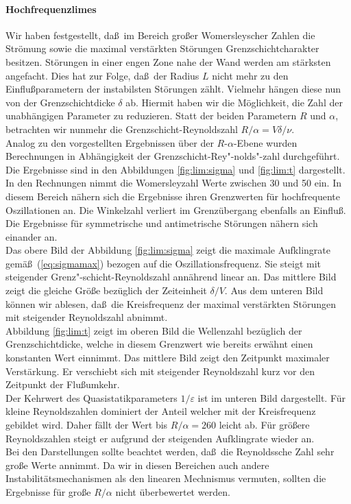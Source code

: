 \documentclass[10pt,a5paper,oneside,draft]{book}
\numberwithin{equation}{chapter}
\begin{document}
\paragraph{Hochfrequenzlimes}
Wir haben festgestellt, da\ss\ im Bereich gro\ss er Womersleyscher Zahlen die Str\"omung sowie die maximal verst\"arkten St\"orungen Grenzschichtcharakter besitzen.
St\"orungen in einer engen Zone nahe der Wand werden am st\"arksten angefacht.
Dies hat zur Folge, da\ss\ der Radius $L$ nicht mehr zu den Einflu\ss parametern der instabilsten St\"orungen z\"ahlt.
Vielmehr h\"angen diese nun von der Grenzschichtdicke $\delta$ ab.
Hiermit haben wir die M\"oglichkeit, die Zahl der unabh\"angigen Parameter zu reduzieren.
Statt der beiden Parametern $R$ und $\alpha$, betrachten wir nunmehr die Grenzschicht-Reynoldszahl $R/\alpha=V\delta/\nu$.\\
Analog zu den vorgestellten Ergebnissen \"uber der $R$-$\alpha$-Ebene wurden Berechnungen in Abh\"angigkeit der Grenzschicht-Rey"-nolds"-zahl durchgef\"uhrt.
Die Ergebnisse sind in den Abbildungen \ref{fig:lim:sigma} und \ref{fig:lim:t} dargestellt.\\
In den Rechnungen nimmt die Womersleyzahl Werte zwischen 30 und 50 ein.
In diesem Bereich n\"ahern sich die Ergebnisse ihren Grenzwerten f\"ur hochfrequente Oszillationen an.
Die Winkelzahl verliert im Grenz\"ubergang ebenfalls an Einflu\ss.
Die Ergebnisse f\"ur symmetrische und antimetrische St\"orungen n\"ahern sich einander an.\\
Das obere Bild der Abbildung \ref{fig:lim:sigma} zeigt die maximale Aufklingrate gem\"a\ss\  (\mbox{\ref{eq:sigmamax}}) bezogen auf die Oszillationsfrequenz.
Sie steigt mit steigender Grenz"-schicht-Reynoldszahl ann\"ahrend linear an.
Das mittlere Bild zeigt die gleiche Gr\"o\ss e bez\"uglich der Zeiteinheit $\delta/V$.
Aus dem unteren Bild k\"onnen wir ablesen, da\ss\ die Kreisfrequenz der maximal verst\"arkten St\"orungen mit steigender Reynoldszahl abnimmt.\\
Abbildung \ref{fig:lim:t} zeigt im oberen Bild die Wellenzahl bez\"uglich der Grenzschichtdicke, welche in diesem Grenzwert wie bereits erw\"ahnt einen konstanten Wert einnimmt.
Das mittlere Bild zeigt den Zeitpunkt maximaler Verst\"arkung.
Er verschiebt sich mit steigender Reynoldszahl kurz vor den Zeitpunkt der Flu\ss umkehr.\\
Der Kehrwert des Quasistatikparameters $1/\varepsilon$ ist im unteren Bild dargestellt.
F\"ur kleine Reynoldszahlen dominiert der Anteil welcher mit der Kreisfrequenz gebildet wird.
Daher f\"allt der Wert bis $R/\alpha=260$ leicht ab.
F\"ur gr\"o\ss ere Reynoldszahlen steigt er aufgrund der steigenden Aufklingrate wieder an.\\
Bei den Darstellungen sollte beachtet werden, da\ss\ die Reynoldssche Zahl sehr gro\ss e Werte annimmt.
Da wir in diesen Bereichen auch andere Instabilit\"atsmechanismen als den linearen Mechnismus vermuten, sollten die Ergebnisse f\"ur gro\ss e $R/\alpha$ nicht \"uberbewertet werden.\\
\end{document}
